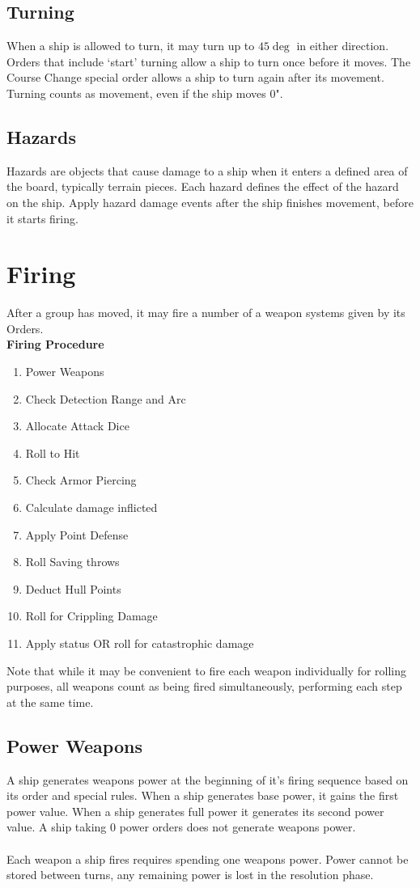 \subsection{Turning}
When a ship is allowed to turn, it may turn up to $45\deg$ in either direction. Orders that include `start' turning allow a ship to turn once  before it moves. The Course Change special order allows a ship to turn again after its movement. Turning counts as movement, even if the ship moves 0".

\subsection{Hazards}
Hazards are objects that cause damage to a ship when it enters a defined area of the board, typically terrain pieces. Each hazard defines the effect of the hazard on the ship. Apply hazard damage events after the ship finishes movement, before it starts firing.

\section{Firing}
After a group has moved, it may fire a number of a weapon systems given by its Orders.\\
\textbf{Firing Procedure}
\begin{enumerate}
	\item Power Weapons
	\item Check Detection Range and Arc
	\item Allocate Attack Dice
	\item Roll to Hit
	\item Check Armor Piercing
	\item Calculate damage inflicted
	\item Apply Point Defense
	\item Roll Saving throws
	\item Deduct Hull Points
	\item Roll for Crippling Damage
	\item Apply status OR roll for catastrophic damage
\end{enumerate}
Note that while it may be convenient to fire each weapon individually for rolling purposes, all weapons count as being fired simultaneously, performing each step at the same time.

\subsection{Power Weapons}
A ship generates weapons power at the beginning of it's firing sequence based on its order and special rules. When a ship generates base power, it gains the first power value. When a ship generates full power it generates its second power value. A ship taking 0 power orders does not generate weapons power.
\\\\
Each weapon a ship fires requires spending one weapons power. Power cannot be stored between turns, any remaining power is lost in the resolution phase.

